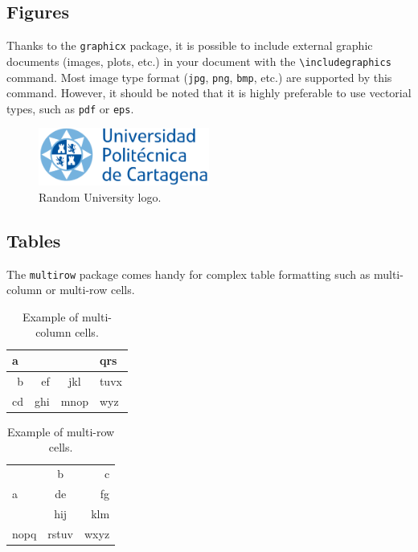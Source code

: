 \documentclass[a4paper, 12pt]{report}
\def\tbs{\textbackslash}
\begin{document}
    \subsection{Figures}

    Thanks to the \texttt{graphicx} package, it is possible to include external graphic documents (images, plots, etc.) in your document with the \texttt{\tbs{}includegraphics} command. Most image type format (\texttt{jpg}, \texttt{png}, \texttt{bmp}, etc.) are supported by this command. However, it should be noted that it is highly preferable to use vectorial types, such as \texttt{pdf} or \texttt{eps}.

    \begin{figure}[h]
        \centering
        \includegraphics[width=0.5\textwidth]{resources/pdf/logo.pdf}
        \caption{Random University logo.}
        \label{fig:random_university_logo}
    \end{figure}

    \subsection{Tables}

    The \texttt{multirow} package comes handy for complex table formatting such as multi-column or multi-row cells.

    \begin{table}[H]
        \centering
        \begin{tabular}{|r|r|c|l|}
            \hline
            \multicolumn{3}{|l|}{a} & qrs  \\ \hline
             b &  ef &     jkl      & tuvx \\ \hline
            cd & ghi &     mnop     & wyz  \\ \hline
        \end{tabular}
        \caption{Example of multi-column cells.}
        \label{tab:multicol_example}
    \end{table}

    \begin{table}[H]
        \centering
        \begin{tabular}{|l|c|r|}
            \hline
            \multirow{3}{2cm}{a} &   b   &    c \\ \cline{2-3}
                                 &  de   &   fg \\ \cline{2-3}
                                 &  hij  &  klm \\ \hline
            nopq                 & rstuv & wxyz \\ \hline
        \end{tabular}
        \caption{Example of multi-row cells.}
        \label{tab:multirow_example}
    \end{table}
\end{document}
